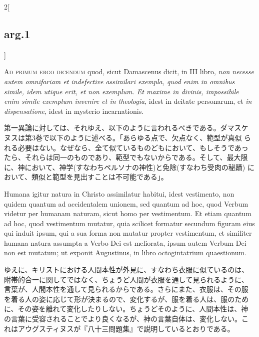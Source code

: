 \documentclass[paper=a4paper,fontsize=10pt,jafontsize=9pt,titlepage]{jlreq}
\begin{document}
\begin{paracol}{2}[\subsection{arg.1}]
\switchcolumn*[\subsection{ad.1}]

{\scshape Ad primum ergo dicendum} quod, sicut Damascenus dicit, in
III libro, {\itshape non necesse autem omnifariam et indefective
assimilari exempla, quod enim in omnibus simile, idem utique erit, et
non exemplum. Et maxime in divinis, impossibile enim simile exemplum
invenire et in theologia}, idest in deitate personarum, et {\itshape
in dispensatione}, idest in mysterio incarnationis.

\switchcolumn

第一異論に対しては、それゆえ、以下のように言われるべきである。ダマスケ
ヌスは第3巻で以下のように述べる。「あらゆる点で、欠点なく、範型が真似
られる必要はない。なぜなら、全て似ているものどもにおいて、もしそうであっ
たら、それらは同一のものであり、範型でもないからである。そして、最大限
に、神において、神学(すなわちペルソナの神性)と免除(すなわち受肉の秘蹟)
において、類似と範型を見出すことは不可能である」。

\switchcolumn*

Humana igitur natura in Christo assimilatur habitui, idest vestimento,
non quidem quantum ad accidentalem unionem, sed quantum ad hoc, quod
Verbum videtur per humanam naturam, sicut homo per vestimentum. Et
etiam quantum ad hoc, quod vestimentum mutatur, quia scilicet formatur
secundum figuram eius qui induit ipsum, qui a sua forma non mutatur
propter vestimentum, et similiter humana natura assumpta a Verbo Dei
est meliorata, ipsum autem Verbum Dei non est mutatum; ut exponit
Augustinus, in libro octogintatrium quaestionum.

\switchcolumn

ゆえに、キリストにおける人間本性が外見に、すなわち衣服に似ているのは、
附帯的合一に関してではなく、ちょうど人間が衣服を通して見られるように、
言葉が、人間本性を通して見られるからである。さらにまた、衣服は、その服
を着る人の姿に応じて形が決まるので、変化するが、服を着る人は、服のため
に、その姿を離れて変化したりしない。ちょうどそのように、人間本性は、神
の言葉に受容されることでより良くなるが、神の言葉自体は、変化しない。こ
れはアウグスティヌスが『八十三問題集』で説明しているとおりである。

\switchcolumn*[\subsection{ad.2}]


\end{paracol}
\end{document}

